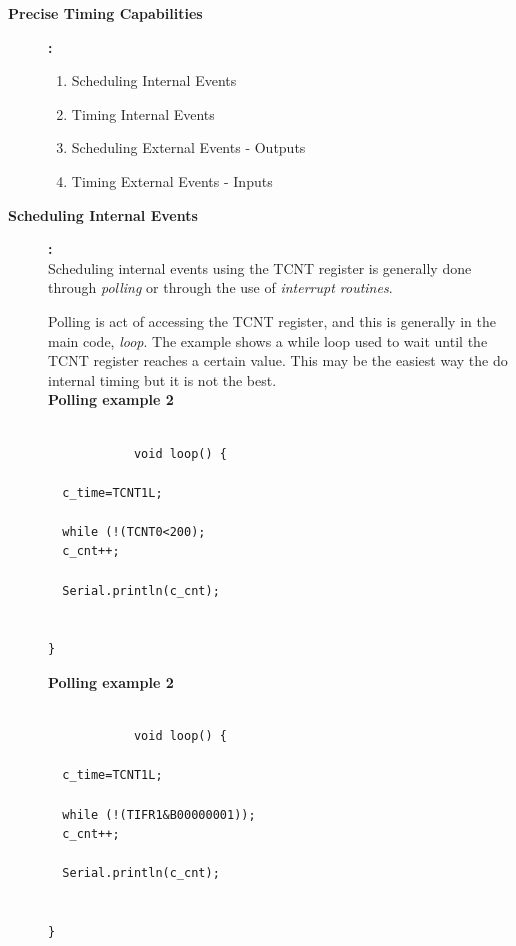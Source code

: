 \documentclass[11pt]{article}
\begin{document}
\begin{description}
\newpage
        
		\item[\textbf{Precise Timing Capabilities}]\textbf{:}\\  
			
			\begin{enumerate}
				\item Scheduling Internal Events
				\item Timing Internal Events
				\item Scheduling External Events - Outputs
				\item Timing External Events - Inputs 	\\
			\end{enumerate}
		
		\item[\textbf{Scheduling Internal Events}]\textbf{:}\\ 
			
		Scheduling internal events using the TCNT register is generally done through {\it polling} or through the use of {\it interrupt routines}. 
		
		Polling is act of accessing the TCNT register, and this is generally in the main code, {\it loop}. The example shows a while loop used to wait until the TCNT register reaches a certain value. This may be the easiest way the do internal timing but it is not the best.\\ 
		
			\textbf{Polling example 2 }
		\begin{verbatim}
			
			void loop() {
  
  c_time=TCNT1L;
  
  while (!(TCNT0<200);
  c_cnt++;

  Serial.println(c_cnt);
  
  
}
		\end{verbatim}
			
		\textbf{Polling example 2 }
		\begin{verbatim}
			
			void loop() {

  c_time=TCNT1L;
  
  while (!(TIFR1&B00000001));
  c_cnt++;

  Serial.println(c_cnt);
  
  
}
		
			
		\end{verbatim}
		

\end{description}
\end{document}
